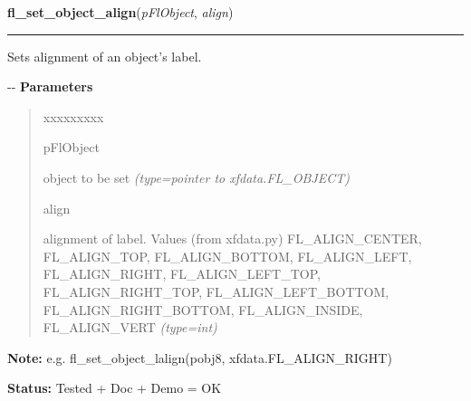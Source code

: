 \hspace{.8\funcindent}\begin{boxedminipage}{\funcwidth}

    \raggedright \textbf{fl\_set\_object\_align}(\textit{pFlObject}, \textit{align})

    \vspace{-1.5ex}

    \rule{\textwidth}{0.5\fboxrule}
\setlength{\parskip}{2ex}

Sets alignment of an object's label.

-{}-
\setlength{\parskip}{1ex}
      \textbf{Parameters}
      \vspace{-1ex}

      \begin{quote}
        \begin{Ventry}{xxxxxxxxx}

          \item[pFlObject]


object to be set
            {\it (type=pointer to xfdata.FL\_OBJECT)}

          \item[align]


alignment of label. Values (from xfdata.py) FL\_ALIGN\_CENTER,
FL\_ALIGN\_TOP, FL\_ALIGN\_BOTTOM, FL\_ALIGN\_LEFT, FL\_ALIGN\_RIGHT,
FL\_ALIGN\_LEFT\_TOP, FL\_ALIGN\_RIGHT\_TOP, FL\_ALIGN\_LEFT\_BOTTOM,
FL\_ALIGN\_RIGHT\_BOTTOM, FL\_ALIGN\_INSIDE, FL\_ALIGN\_VERT
            {\it (type=int)}

        \end{Ventry}

      \end{quote}

\textbf{Note:} 
e.g. fl\_set\_object\_lalign(pobj8, xfdata.FL\_ALIGN\_RIGHT)


\textbf{Status:} 
Tested + Doc + Demo = OK


    \end{boxedminipage}

    \label{xformslib:flbasic:fl_set_object_shortcut}

    \vspace{0.5ex}

